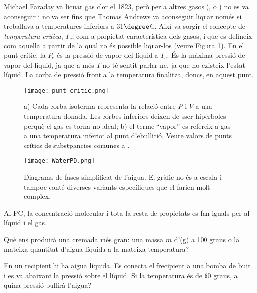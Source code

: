 Michael Faraday va licuar gas clor el 1823, però per a altres gasos (,  o ) no es va aconseguir i no va ser fins que Thomas Andrews va aconseguir liquar  només si treballava a temperatures inferiors a 31$\degree$C. Així va sorgir el concepte de \emph{temperatura crítica}, $T_c$, com a propietat característica dels gasos, i que es defineix com aquella a partir de la qual no és possible liquar-los (veure Figura \ref{fig:punt_critic}).
En el punt crític, la $P_c$ és la pressió de vapor del líquid a $T_c$. És la màxima pressió de vapor del líquid, ja que a més $T$ no té sentit parlar-ne, ja que no existeix l'estat líquid. La corba de pressió front a la temperatura finalitza, doncs, en aquest punt.

\begin{figure}[h]
\centering
\texttt{[image: punt\_critic.png]}
\caption[Punt crític]{a) Cada corba isoterma representa la relació entre $P$ i $V$ a una temperatura donada. Les corbes inferiors deixen de sser hipèrboles perquè el gas es torna no ideal; b) el terme ``vapor'' es refereix a gas a una temperatura inferior al punt d'ebullició. Veure valors de punts crítics de substpancies comunes a .\citep{openstax_cnx_openstax_nodate}}
\label{fig:punt_critic}
\end{figure}


\begin{figure}[h]
\centering
\texttt{[image: WaterPD.png]}
\caption[Diagrama de fases simplificat de l'aigua]{Diagrama de fases simplificat de l'aigua. El gràfic no és a escala i tampoc conté diverses variants específiques que el farien molt complex.\citep{openstax_cnx_openstax_nodate}}
\label{fig:WaterPD}
\end{figure}
Al PC, la concentració molecular i tota la resta de propietats es fan iguals per al líquid i el gas.

\begin{exr}
Què ens produirà una cremada més gran: una massa $m$ d'(g) a 100 graus o la mateixa quantitat d'aigua líquida a la mateixa temperatura?
\end{exr}

\begin{exr}
En un recipient hi ha aigua líquida. Es conecta el frecipient a una bomba de buit i es va abaixant la pressió sobre el líquid. Si la temperatura és de 60 graus, a quina pressió bullirà l'aigua?
\end{exr}


